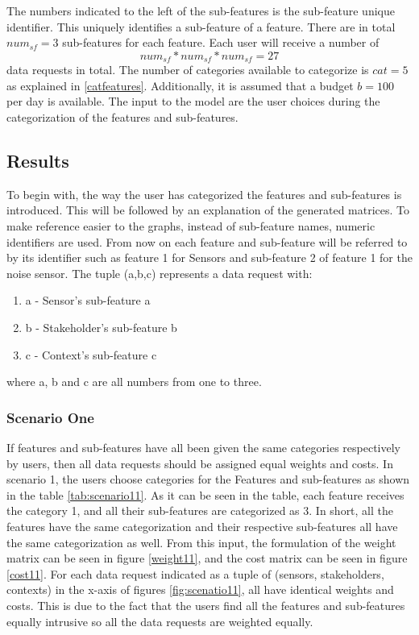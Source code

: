 The numbers indicated to the left of the sub-features is the sub-feature unique identifier. This uniquely identifies a sub-feature of a feature. There are in total $num_{sf}=3$ sub-features for each feature.
Each user will receive a number of $$num_{sf}*num_{sf}*num_{sf}=27$$ data requests in total. The number of categories available to categorize is $cat=5$ as explained in \ref{catfeatures}. Additionally, it is assumed that a budget $b=100$ per day is available. 
The input to the model are the user choices during the categorization of the features and sub-features.

\subsection{Results}

To begin with, the way the user has categorized the features and sub-features is introduced. This will be followed by an explanation
of the generated matrices. To make reference easier to the graphs, instead of sub-feature names, numeric identifiers are used. From now on each feature and sub-feature will be referred to by its identifier such as feature 1 for Sensors and sub-feature 2 of feature 1 for the noise sensor. The tuple (a,b,c) represents a data request with:
\begin{enumerate}
    \item a - Sensor's sub-feature a
    \item b - Stakeholder's sub-feature b
    \item c - Context's sub-feature c
   \end{enumerate}
where a, b and c are all numbers from one to three.

\subsubsection{Scenario One}

If features and sub-features have all been given the same categories respectively by users, then all data requests should be assigned equal weights and costs.
In scenario 1, the users choose categories for the Features and sub-features as shown in the table \ref{tab:scenario11}. As it can be seen in the table, each feature receives the 
category 1, and all their sub-features are categorized as 3. In short, all the features have the same categorization and their respective
sub-features all have the same categorization as well. From this input, the formulation of the weight matrix can be seen in figure \ref{weight11}, and the cost matrix can be seen in figure \ref{cost11}.
For each data request indicated as a tuple of (sensors, stakeholders, contexts) in the x-axis of figures \ref{fig:scenatio11}, all have identical weights and costs. This is due to the fact that the users find all the features and sub-features equally intrusive so all the data requests are weighted equally.


